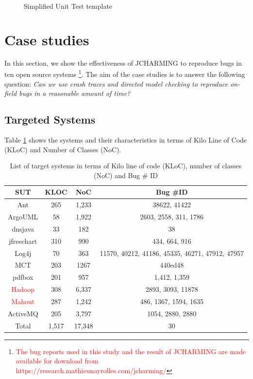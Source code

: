\documentclass[times, doublespace]{smrauth}
\newcommand{\red}[1]{\textcolor{red}{#1}}
\begin{document}
{\begin{figure}[h!]

\noindent\fbox{%
    \parbox{\textwidth}{%
    
}%
}

    \caption{Simplified Unit Test template
    \label{fig:jcharming-unittemplate}}
\end{figure}

\section{Case studies\label{sec:cases}}

In this section, we show the effectiveness of JCHARMING to
reproduce bugs in ten open source systems
\footnote{\red{The bug reports used in this study and the result of JCHARMING are
made available for download from https://research.mathieu\-nayrolles.com/jcharming/}}. The aim of the
case studies is to answer the following question: {\it Can we use
crash traces and directed model checking to reproduce on-
field bugs in a reasonable amount of time?}

\subsection{Targeted Systems}

Table \ref{tab:jacharming-systems} shows the systems and their characteristics in terms of
Kilo Line of Code (KLoC) and Number of Classes (NoC).

\begin{table}
\centering

\caption{List of target systems in terms of Kilo line of code (KLoC), number of classes (NoC) and Bug \# ID}
\begin{tabular}{c|c|c|c}
SUT        & KLOC & NoC  & Bug \#ID                                        \\ \hline \hline
Ant        & 265  & 1,233 & 38622, 41422                                    \\
ArgoUML    & 58   & 1,922 & 2603, 2558, 311, 1786                           \\
dnsjava    & 33   & 182  & 38                                              \\
jfreechart & 310  & 990  & 434, 664, 916                                   \\
Log4j      & 70   & 363  & 11570, 40212, 41186, 45335, 46271, 47912, 47957 \\
MCT        & 203  & 1267 & 440ed48                                         \\
pdfbox     & 201  & 957  & 1,412, 1,359 \\
\red{Hadoop} 	   & 308   & 6,337 & 2893, 3093, 11878\\
\red{Mahout} 	   & 287  & 1,242 &  486, 1367, 1594, 1635\\
ActiveMQ   & 205  & 3,797 & 1054, 2880, 2880\\ \hline
Total      & 1,517 & 17,348 & 30 \\
\hline \hline
\end{tabular}
\label{tab:jacharming-systems}
\end{table}


}
\end{document}
